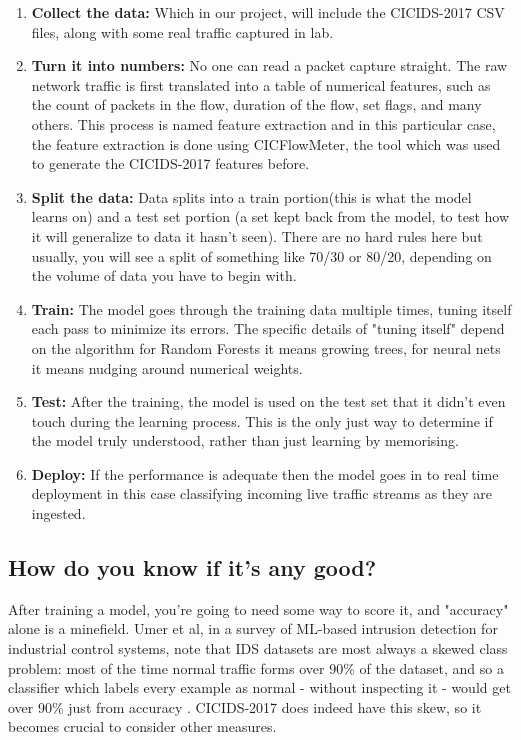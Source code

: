 \begin{enumerate}[label=\arabic*.]
  \item \textbf{Collect the data:} Which in our project, will include the CICIDS-2017 CSV files, along with some real traffic captured in lab.

  \item \textbf{Turn it into numbers:} No one can read a packet capture straight. The raw network traffic is first translated into a table of numerical features, such as the count of packets in the flow, duration of the flow, set flags, and many others. This process is named feature extraction and in this particular case, the feature extraction is done using CICFlowMeter, the tool which was used to generate the CICIDS-2017 features before.
  \item \textbf{Split the data:} Data splits into a train portion(this is what the model learns on) and a test set portion (a set kept back from the model, to test how it will generalize to data it hasn't seen). There are no hard rules here but usually, you will see a split of something like 70/30 or 80/20, depending on the volume of data you have to begin with.

  \item \textbf{Train:} The model goes through the training data multiple times, tuning itself each pass to minimize its errors. The specific details of "tuning itself" depend on the algorithm for Random Forests it means growing trees, for neural nets it means nudging around numerical weights.

  \item \textbf{Test:} After the training, the model is used on the test set that it didn't even touch during the learning process. This is the only just way to determine if the model truly understood, rather than just learning by memorising.

  \item \textbf{Deploy:} If the performance is adequate then the model goes in to real time deployment in this case classifying incoming live traffic streams as they are ingested.
\end{enumerate}

\subsection{How do you know if it's any good?}

After training a model, you're going to need some way to score it, and "accuracy" alone is a minefield. Umer et al, in a survey of ML-based intrusion detection for industrial control systems, note that IDS datasets are most always a skewed class problem: most of the time normal traffic forms over 90\% of the dataset, and so a classifier which labels every example as normal - without inspecting it - would get over 90\% just from accuracy \cite{umer2022ics}. CICIDS-2017 does indeed have this skew, so it becomes crucial to consider other measures.

